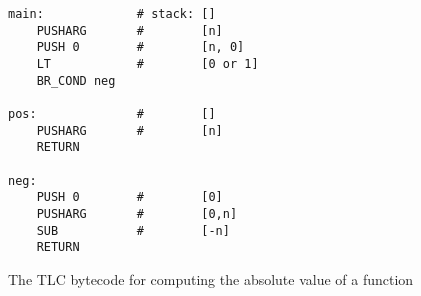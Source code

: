 \begin{figure}[h]
\begin{center}
\begin{lstlisting}
main:             # stack: []
    PUSHARG       #        [n]
    PUSH 0        #        [n, 0]
    LT            #        [0 or 1]
    BR_COND neg

pos:              #        []
    PUSHARG       #        [n]
    RETURN

neg:
    PUSH 0        #        [0]
    PUSHARG       #        [0,n]
    SUB           #        [-n]
    RETURN
\end{lstlisting}
\caption{The TLC bytecode for computing the absolute value of a function}
\label{fig:tlc-abs}
\end{center}
\end{figure}
